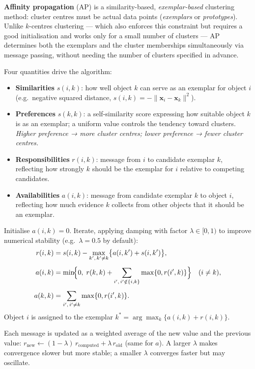 \documentclass[11pt, oneside]{book}
\begin{document}
\textbf{Affinity propagation} (AP) is a similarity-based,
\emph{exemplar-based} clustering method: cluster centres must be actual data
points (\emph{exemplars} or \emph{prototypes}).
Unlike $k$-centres clustering — which also enforces this constraint but
requires a good initialisation and works only for a small number of clusters —
AP determines both the exemplars and the cluster memberships simultaneously
via message passing, without needing the number of clusters specified in
advance.

Four quantities drive the algorithm:
\begin{itemize}
  \item \textbf{Similarities} $s(i,k)$: how well object $k$ can serve as an
        exemplar for object $i$ (e.g.\ negative squared distance,
        $s(i,k)=-\|\bm{x}_i-\bm{x}_k\|^2$).
  \item \textbf{Preferences} $s(k,k)$: a self-similarity score expressing how
        suitable object $k$ is as an exemplar; a uniform value controls the tendency toward
        clusters. \emph{Higher preference → more cluster centres; lower
        preference → fewer cluster centres.}
  \item \textbf{Responsibilities} $r(i,k)$: message from $i$ to candidate
        exemplar $k$, reflecting how strongly $k$ should be the exemplar for
        $i$ relative to competing candidates.
  \item \textbf{Availabilities} $a(i,k)$: message from candidate exemplar $k$
        to object $i$, reflecting how much evidence $k$ collects from other
        objects that it should be an exemplar.
\end{itemize}

\begin{defbox}[title={Affinity Propagation update rules}]
Initialise $a(i,k)=0$.  Iterate, applying damping with factor $\lambda\in[0,1)$
to improve numerical stability (e.g.\ $\lambda=0.5$ by default):
\begin{align*}
  r(i,k) &= s(i,k) - \max_{k',\,k'\neq k}\bigl\{a(i,k') + s(i,k')\bigr\},\\[4pt]
  a(i,k) &= \min\!\Bigl\{0,\;r(k,k) + \sum_{i',\,i'\notin\{i,k\}}\max\{0,r(i',k)\}\Bigr\}
             \quad (i\neq k),\\[4pt]
  a(k,k) &= \sum_{i',\,i'\neq k}\max\{0,r(i',k)\}.
\end{align*}
Object $i$ is assigned to the exemplar $k^* = \arg\max_k\{a(i,k)+r(i,k)\}$.

Each message is updated as a weighted average of the new value and the previous value:
$r_{\text{new}} \leftarrow (1-\lambda)\,r_{\text{computed}} + \lambda\,r_{\text{old}}$
(same for $a$). A larger $\lambda$ makes convergence slower but more stable; a smaller $\lambda$
converges faster but may oscillate.
\end{defbox}
\end{document}
